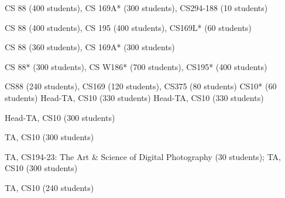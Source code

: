     CS 88 (400 students), CS 169A* (300 students), CS294-188 (10 students)

     CS 88 (400 students), CS 195 (400 students), CS169L* (60 students)

     CS 88 (360 students), CS 169A* (300 students)

     CS 88* (300 students), CS W186* (700 students), CS195* (400 students)
      
     CS88 (240 students), CS169 (120 students), CS375 (80 students)
     CS10* (60 students)
     Head-TA, CS10 (330 students)
     Head-TA, CS10 (330 students)
    
     Head-TA, CS10 (300 students)
    
     TA, CS10 (300 students)
    
     TA, CS194-23: The Art \& Science of Digital Photography (30 students); TA, CS10 (300 students)
    
     TA, CS10 (240 students)
    
